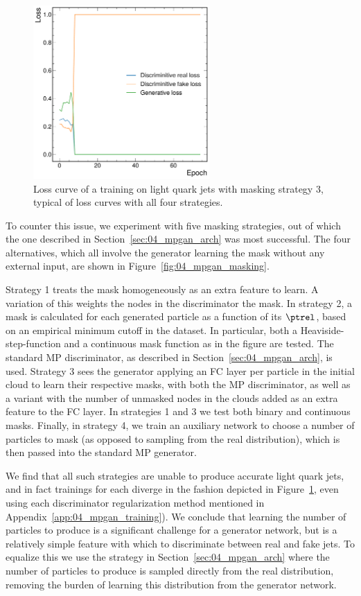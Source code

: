 \begin{figure}[htpb]
    \centering
    \centerline{\includegraphics[width=0.6\textwidth]{figures/04-ML4Sim/mpgan/masking/masking_loss.pdf}}
    \caption{Loss curve of a training on light quark jets with masking strategy 3, typical of loss curves with all four strategies.
    }
    \label{fig:04_mpgan_masking_loss}
\end{figure}

To counter this issue, we experiment with five masking strategies, out of which the one described in Section~\ref{sec:04_mpgan_arch} was most successful.
The four alternatives, which all involve the generator learning the mask without any external input, are shown in Figure~\ref{fig:04_mpgan_masking}.

Strategy 1 treats the mask homogeneously as an extra feature to learn.
A variation of this weights the nodes in the discriminator the mask.
In strategy 2, a mask is calculated for each generated particle as a function of its $\ptrel$, based on an empirical minimum cutoff in the dataset.
In particular, both a Heaviside-step-function and a continuous mask function as in the figure are tested.
The standard MP discriminator, as described in Section~\ref{sec:04_mpgan_arch}, is used.
Strategy 3 sees the generator applying an FC layer per particle in the initial cloud to learn their respective masks, with both the MP discriminator, as well as a variant with the number of unmasked nodes in the clouds added as an extra feature to the FC layer.
In strategies 1 and 3 we test
both binary and continuous masks.
Finally, in strategy 4, we train an auxiliary network to choose a number of particles to mask (as opposed to sampling from the real distribution), which is then passed into the standard MP generator.

We find that all such strategies are unable to produce accurate light quark jets, and in fact trainings for each diverge in the fashion depicted in Figure~\ref{fig:04_mpgan_masking_loss}, even using each discriminator regularization method mentioned in Appendix~\ref{app:04_mpgan_training}).
We conclude that learning the number of particles to produce is a significant challenge for a generator network, but is a relatively simple feature with which to discriminate between real and fake jets.
To equalize this we use the strategy in Section~\ref{sec:04_mpgan_arch} where the number of particles to produce is sampled directly from the real distribution, removing the burden of learning this distribution from the generator network.

